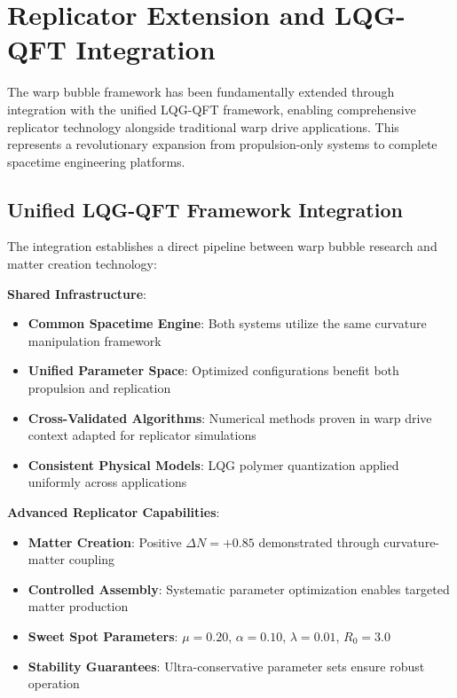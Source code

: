 
\section{Replicator Extension and LQG-QFT Integration}

The warp bubble framework has been fundamentally extended through integration with the unified LQG-QFT framework, enabling comprehensive replicator technology alongside traditional warp drive applications. This represents a revolutionary expansion from propulsion-only systems to complete spacetime engineering platforms.

\subsection{Unified LQG-QFT Framework Integration}

The integration establishes a direct pipeline between warp bubble research and matter creation technology:

\textbf{Shared Infrastructure}:
\begin{itemize}
\item \textbf{Common Spacetime Engine}: Both systems utilize the same curvature manipulation framework
\item \textbf{Unified Parameter Space}: Optimized configurations benefit both propulsion and replication
\item \textbf{Cross-Validated Algorithms}: Numerical methods proven in warp drive context adapted for replicator simulations
\item \textbf{Consistent Physical Models}: LQG polymer quantization applied uniformly across applications
\end{itemize}

\textbf{Advanced Replicator Capabilities}:
\begin{itemize}
\item \textbf{Matter Creation}: Positive $\Delta N = +0.85$ demonstrated through curvature-matter coupling
\item \textbf{Controlled Assembly}: Systematic parameter optimization enables targeted matter production
\item \textbf{Sweet Spot Parameters}: $\mu = 0.20$, $\alpha = 0.10$, $\lambda = 0.01$, $R_0 = 3.0$
\item \textbf{Stability Guarantees}: Ultra-conservative parameter sets ensure robust operation
\end{itemize}

